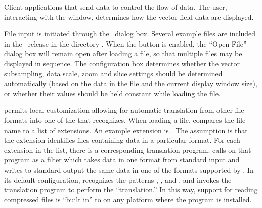 Client applications that send data to  control the flow of
data.  The user, interacting with the  window, determines
how the vector field data are displayed.

File input is initiated through the \ dialog
box.  Several example files are included in the \OOMMF\ release in the
directory .  When the  button is
enabled, the ``Open File'' dialog box will remain open after loading a
file, so that multiple files may be displayed in sequence.  The
{} configuration box determines whether the vector
subsampling, data scale, zoom and slice settings should be
determined automatically (based on the data in the file and the current
display window size), or whether their values should be held constant
while loading the file.


 permits local customization allowing for automatic
translation from other file formats into one of the
 that  recognizes.  When loading
a file,  compares the file name to a list of extensions.
An example extension is .  The assumption is that the extension
identifies files containing data in a particular format.  For each
extension in the list, there is a corresponding translation program.
 calls on that program as a filter which takes data in one
format from standard input and writes to standard output the same data
in one of the formats supported by .  In its default
configuration,  recognizes the patterns , ,
and , and invokes the translation
program {} to perform the
``translation.''  In this way, support for reading
compressed files is
``built in'' to  on any platform where the 
program is installed.

